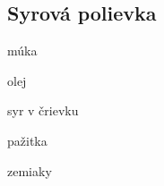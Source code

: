 \setcounter{step}{0}
\subsection{Syrová polievka}

\begin{ingredient}
\begin{main}
	\item múka
	\item olej
	\item syr v črievku
	\item pažitka
	\item zemiaky
\end{main}
\end{ingredient}%
\begin{recipe}




\end{recipe}

\begin{notes}

\end{notes}	